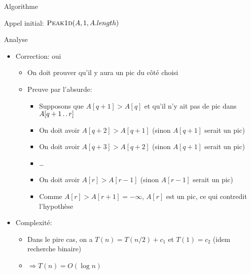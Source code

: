 \begin{frame}{Algorithme}

\begin{center}
{\small
{}
}
\end{center}

\centerline{Appel initial: $\textnormal{\scshape Peak1d}(A,1,A.length)$}

\end{frame}

\begin{frame}{Analyse}
\begin{itemize}
\item Correction: oui
\begin{itemize}
\item On doit prouver qu'il y aura un pic du côté choisi
\item Preuve par l'absurde:
\begin{itemize}
\item Supposons que $A[q+1]>A[q]$ et qu'il n'y ait pas de pic dans $A[q+1\mathinner{\ldotp\ldotp} r]$
\item On doit avoir $A[q+2]>A[q+1]$ (sinon $A[q+1]$ serait un pic)
\item On doit avoir $A[q+3]>A[q+2]$ (sinon $A[q+1]$ serait un pic)
\item \ldots
\item On doit avoir $A[r]>A[r-1]$ (sinon $A[r-1]$ serait un pic)
\item Comme $A[r]>A[r+1]=-\infty$, $A[r]$ est un pic, ce qui contredit l'hypothèse
\end{itemize}
\end{itemize}

\bigskip

\item Complexité:
\begin{itemize}
\item Dans le pire cas, on a $T(n)=T(n/2)+c_1$ et $T(1)=c_2$ (idem recherche binaire)
\item $\Rightarrow T(n)=O(\log n)$
\end{itemize}
\end{itemize}
\end{frame}

